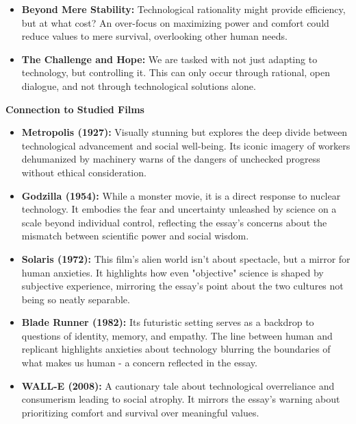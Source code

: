 \documentclass[11pt,fleqn]{book} %
\begin{document}
\begin{itemize}
\item \textbf{Beyond Mere Stability:} Technological rationality might provide efficiency, but at what cost? An over-focus on maximizing power and comfort could reduce values to mere survival, overlooking other human needs.

\item \textbf{The Challenge and Hope:} We are tasked with not just adapting to technology, but controlling it. This can only occur through rational, open dialogue, and not through technological solutions alone.

\end{itemize}
\vspace{5pt}
\textbf{Connection to Studied Films}

\begin{itemize}
\item \textbf{Metropolis (1927):}  Visually stunning but explores the deep divide between technological advancement and social well-being.  Its iconic imagery of workers dehumanized by machinery warns of the dangers of unchecked progress without ethical consideration.

\item \textbf{Godzilla (1954):} While a monster movie, it is a direct response to nuclear technology. It embodies the fear and uncertainty unleashed by science on a scale beyond individual control, reflecting the essay's concerns about the mismatch between scientific power and social wisdom.

\item \textbf{Solaris (1972):} This film's alien world isn't about spectacle, but a mirror for human anxieties. It highlights how even "objective" science is shaped by subjective experience, mirroring the essay's point about the two cultures not being so neatly separable.

\item \textbf{Blade Runner (1982):}  Its futuristic setting serves as a backdrop to questions of identity, memory, and empathy. The line between human and replicant highlights anxieties about technology blurring the boundaries of what makes us human - a concern reflected in the essay. 

\item \textbf{WALL-E (2008):} A cautionary tale about technological overreliance and consumerism leading to social atrophy. It mirrors the essay's warning about prioritizing comfort and survival over meaningful values. 

\end{itemize}
\end{document}
